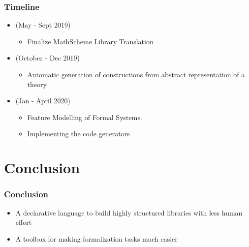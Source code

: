\documentclass[t,12pt,numbers,fleqn,usenames,xcolor=dvipsnames]{beamer}
\begin{document}
\begin{frame}
\frametitle{Timeline}
\begin{itemize}
	\item (May - Sept 2019)
	\begin{itemize}
		\item Finalize MathScheme Library Translation 
	\end{itemize}
	\item (October - Dec 2019)
	\begin{itemize}
		\item Automatic generation of constructions from abstract 
		representation of a theory
	\end{itemize}
	\item (Jan - April 2020)
	\begin{itemize}
		\item Feature Modelling of Formal Systems. 
		\item Implementing the code generators 
	\end{itemize}
\end{itemize}
\end{frame}

\section{Conclusion}
\begin{frame}[fragile]
\frametitle{Conclusion}
\begin{itemize}
	\item A declarative language to build highly structured libraries with less human effort 
	\item A toolbox for making formalization tasks much easier 
\end{itemize}
\end{frame}
\end{document}
